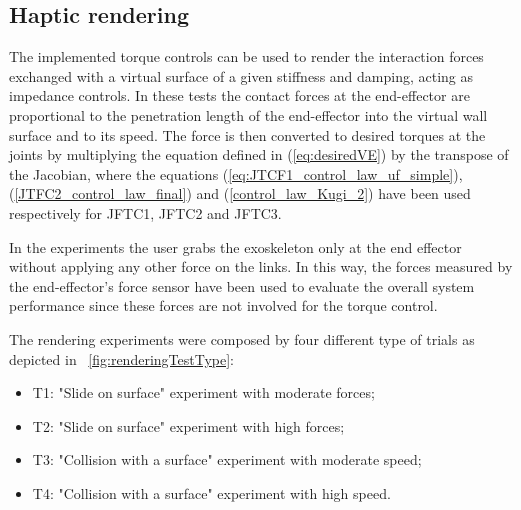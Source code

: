 \subsection{Haptic rendering}

The implemented torque controls can be used to render the interaction forces exchanged with a virtual surface of a given stiffness and damping, acting as impedance controls. In these tests the contact forces at the end-effector are proportional to the penetration length of the end-effector into the virtual wall surface and to its speed. The force is then converted to desired torques at the joints by multiplying the equation defined in (\ref{eq:desiredVE}) by the transpose of the Jacobian, where the equations (\ref{eq:JTCF1_control_law_uf_simple}), (\ref{JTFC2_control_law_final}) and (\ref{control_law_Kugi_2}) have been used respectively for JFTC1, JFTC2 and JFTC3.
\par In the experiments the user grabs the exoskeleton only at the end effector without applying any other force on the links. In this way, the forces measured by the end-effector's force sensor have been used to evaluate the overall system performance since these forces are not involved for the torque control.
\par The rendering experiments were composed by four different type of trials as depicted in \figurename \ \ref{fig:renderingTestType}:
\begin{itemize}
	\item T1: "Slide on surface" experiment with moderate forces;
	\item T2: "Slide on surface" experiment with high forces;
	\item T3: "Collision with a surface" experiment with moderate speed;
	\item T4: "Collision with a surface" experiment with high speed.
\end{itemize}

